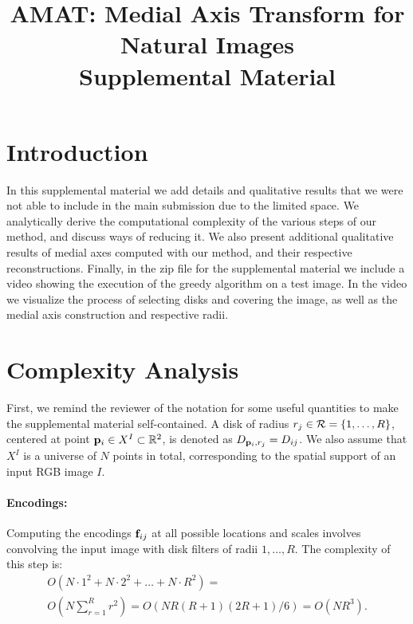 \documentclass[10pt,twocolumn,letterpaper]{article}
\begin{document}
\title{AMAT: Medial Axis Transform for Natural Images \\ Supplemental Material}
\maketitle

\section{Introduction}\label{sec:introduction}
In this supplemental material we add details and qualitative results that we were not able to include in the main submission due to the limited space.
We analytically derive the computational complexity of the various steps of our method, and discuss ways of reducing it.
We also present additional qualitative results of medial axes computed with our method, and their respective reconstructions.
Finally, in the zip file for the supplemental material we include a video showing the execution of the greedy algorithm on a test image.
In the video we visualize the process of selecting disks and covering the image, as well as the medial axis construction and respective radii.

\section{Complexity Analysis}\label{sec:complexity}
First, we remind the reviewer of the notation for some useful quantities to make the supplemental material self-contained.
A disk of radius $r_j\in \mathcal{R} = \{1,\ldots,R\}$, 
centered at point $\mathbf{p}_{i}\in X^I \subset \mathbb{R}^2$, is denoted as $D_{\mathbf{p}_{i},r_j} = D_{ij}$.
We also assume that $X^I$ is a universe of $N$ points in total, corresponding to the spatial support of an input RGB image $I$.

\paragraph{Encodings:} Computing the encodings $\mathbf{f}_{ij}$ at all possible locations and scales involves convolving the input image 
with disk filters of radii $1,\ldots,R$. 
The complexity of this step is:
\begin{align}
\nonumber
O(N\cdot 1^2 + N\cdot 2^2 + \ldots + N \cdot R^2) = \\
O(N\sum_{r=1}^R r^2) = O(NR(R+1)(2R+1)/6) = O(NR^3).
\end{align}
\end{document}
